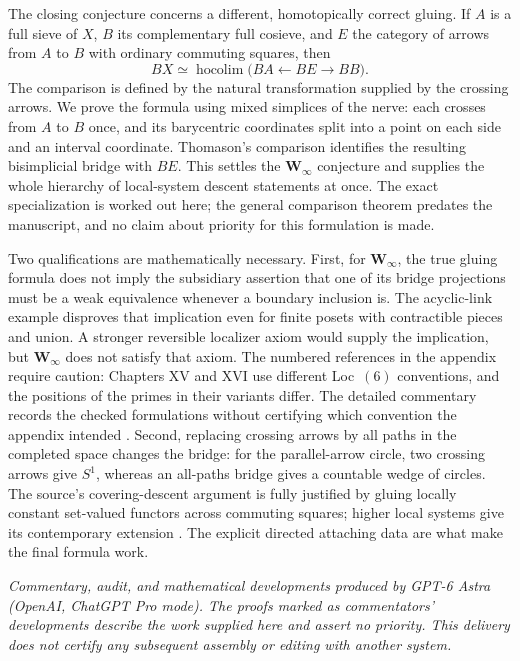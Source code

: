 The closing conjecture concerns a different, homotopically correct gluing. If \(A\) is a full sieve of \(X\), \(B\) its complementary full cosieve, and \(E\) the category of arrows from \(A\) to \(B\) with ordinary commuting squares, then
\[
 BX\simeq\operatorname{hocolim}\bigl(BA\longleftarrow BE\longrightarrow BB\bigr).
\]
The comparison is defined by the natural transformation supplied by the crossing arrows. We prove the formula using mixed simplices of the nerve: each crosses from \(A\) to \(B\) once, and its barycentric coordinates split into a point on each side and an interval coordinate. Thomason's comparison identifies the resulting bisimplicial bridge with \(BE\). This settles the \(\mathbf W_\infty\) conjecture and supplies the whole hierarchy of local-system descent statements at once. The exact specialization is worked out here; the general comparison theorem predates the manuscript, and no claim about priority for this formulation is made.

Two qualifications are mathematically necessary. First, for \(\mathbf W_\infty\), the true gluing formula does not imply the subsidiary assertion that one of its bridge projections must be a weak equivalence whenever a boundary inclusion is. The acyclic-link example disproves that implication even for finite posets with contractible pieces and union. A stronger reversible localizer axiom would supply the implication, but \(\mathbf W_\infty\) does not satisfy that axiom. The numbered references in the appendix require caution: Chapters XV and XVI use different Loc~\((6)\) conventions, and the positions of the primes in their variants differ. The detailed commentary records the checked formulations without certifying which convention the appendix intended \citep{Grothendieck1990XV,GrothendieckDerivateursXVI}. Second, replacing crossing arrows by all paths in the completed space changes the bridge: for the parallel-arrow circle, two crossing arrows give \(S^1\), whereas an all-paths bridge gives a countable wedge of circles. The source's covering-descent argument is fully justified by gluing locally constant set-valued functors across commuting squares; higher local systems give its contemporary extension \citep{Lurie2009HTT}. The explicit directed attaching data are what make the final formula work.

\medskip
\noindent\emph{Commentary, audit, and mathematical developments produced by GPT-6 Astra (OpenAI, ChatGPT Pro mode). The proofs marked as commentators' developments describe the work supplied here and assert no priority. This delivery does not certify any subsequent assembly or editing with another system.}
